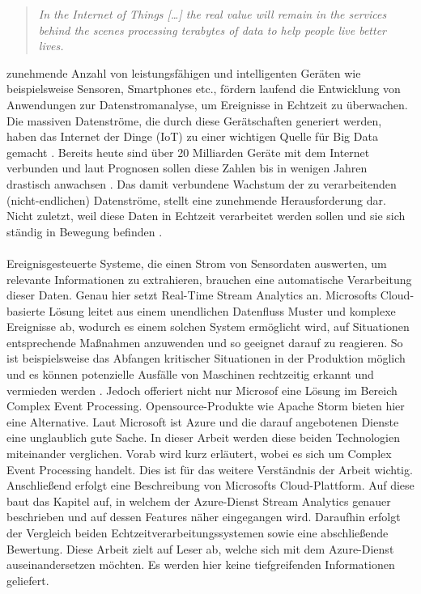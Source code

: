 
\begin{quote} \textit{\glqq In the Internet of Things […] the real value will remain in the services behind the scenes processing terabytes of data to help people live better lives. \grqq~}\cite{Floarea.2014}\\ \end{quote} 

 zunehmende Anzahl von leistungsfähigen und intelligenten Geräten wie beispielsweise Sensoren, Smartphones etc., fördern laufend die Entwicklung von Anwendungen zur Datenstromanalyse, um Ereignisse in Echtzeit zu überwachen. Die massiven Datenströme, die durch diese Gerätschaften generiert werden, haben das Internet der Dinge (IoT) zu einer wichtigen Quelle für Big Data gemacht \cite{Prosise.}. Bereits heute sind über 20 Milliarden Geräte mit dem Internet verbunden und laut Prognosen sollen diese Zahlen bis in wenigen Jahren drastisch anwachsen \cite{Statista.2017}. Das damit verbundene Wachstum der zu verarbeitenden (nicht-endlichen) Datenströme, stellt eine zunehmende Herausforderung dar. Nicht zuletzt, weil diese Daten in Echtzeit verarbeitet werden sollen und sie sich ständig in Bewegung befinden \cite{Prosise.}.\\ \\ Ereignisgesteuerte Systeme, die einen Strom von Sensordaten auswerten, um relevante Informationen zu extrahieren, brauchen eine automatische Verarbeitung dieser Daten. Genau hier setzt Real-Time Stream Analytics an. Microsofts Cloud-basierte Lösung leitet aus einem unendlichen Datenfluss Muster und komplexe Ereignisse ab, wodurch es einem solchen System ermöglicht wird, auf Situationen entsprechende Maßnahmen anzuwenden und so geeignet darauf zu reagieren. So ist beispielsweise das Abfangen kritischer Situationen in der Produktion möglich und es können potenzielle Ausfälle von Maschinen rechtzeitig erkannt und vermieden werden \cite{rcrwireless.2016}. Jedoch offeriert nicht nur Microsof eine Lösung im Bereich Complex Event Processing. Opensource-Produkte wie Apache Storm bieten hier eine Alternative. Laut Microsoft ist Azure und die darauf angebotenen Dienste eine unglaublich gute Sache. In dieser Arbeit werden diese beiden Technologien miteinander verglichen. Vorab wird kurz erläutert, wobei es sich um Complex Event Processing handelt. Dies ist für das weitere Verständnis der Arbeit wichtig. Anschließend erfolgt eine Beschreibung von Microsofts Cloud-Plattform. Auf diese baut das Kapitel auf, in welchem der Azure-Dienst Stream Analytics genauer beschrieben und auf dessen Features näher eingegangen wird. Daraufhin erfolgt der Vergleich beiden Echtzeitverarbeitungssystemen sowie eine abschließende Bewertung. Diese Arbeit zielt auf Leser ab, welche sich mit dem Azure-Dienst auseinandersetzen möchten. Es werden hier keine tiefgreifenden Informationen geliefert.
